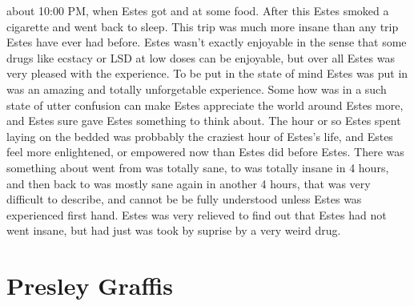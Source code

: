 \documentclass[12pt]{book}
\begin{document}
about 10:00 PM, when Estes got and at some food. After this Estes smoked a cigarette and went back to sleep. This trip was much more insane than any trip Estes have ever had before. Estes wasn't exactly enjoyable in the sense that some drugs like ecstacy or LSD at low doses can be enjoyable, but over all Estes was very pleased with the experience. To be put in the state of mind Estes was put in was an amazing and totally unforgetable experience. Some how was in a such state of utter confusion can make Estes appreciate the world around Estes more, and Estes sure gave Estes something to think about. The hour or so Estes spent laying on the bedded was probbably the craziest hour of Estes's life, and Estes feel more enlightened, or empowered now than Estes did before Estes. There was something about went from was totally sane, to was totally insane in 4 hours, and then back to was mostly sane again in another 4 hours, that was very difficult to describe, and cannot be be fully understood unless Estes was experienced first hand. Estes was very relieved to find out that Estes had not went insane, but had just was took by suprise by a very weird drug.



\chapter{Presley Graffis}
\end{document}
